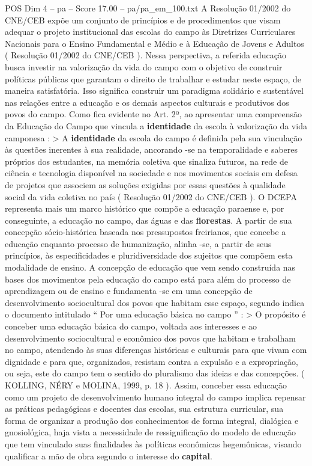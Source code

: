 \begin{textsample}{POS Dim 4 – pa – Score 17.00 – pa/pa\_em\_100.txt}
A Resolução 01/2002 do CNE/CEB expõe um conjunto de princípios e de procedimentos que visam adequar o projeto institucional das escolas do campo às Diretrizes Curriculares Nacionais para o Ensino Fundamental e Médio e à Educação de Jovens e Adultos ( Resolução 01/2002 do CNE/CEB ).
Nessa perspectiva, a referida educação busca investir na valorização da vida do campo com o objetivo de construir políticas públicas que garantam o direito de trabalhar e estudar neste espaço, de maneira satisfatória.
Isso significa construir um paradigma solidário e sustentável nas relações entre a educação e os demais aspectos culturais e produtivos dos povos do campo.
Como fica evidente no Art. 2º, ao apresentar uma compreensão da Educação do Campo que vincula a \textbf{identidade} da escola à valorização da vida camponesa : > A \textbf{identidade} da escola do campo é definida pela sua vinculação às questões inerentes à sua realidade, ancorando -se na temporalidade e saberes próprios dos estudantes, na memória coletiva que sinaliza futuros, na rede de ciência e tecnologia disponível na sociedade e nos movimentos sociais em defesa de projetos que associem as soluções exigidas por essas questões à qualidade social da vida coletiva no país ( Resolução 01/2002 do CNE/CEB ).
O DCEPA representa mais um marco histórico que compõe a educação paraense e, por conseguinte, a educação no campo, das águas e das \textbf{florestas}.
A partir de sua concepção sócio-histórica baseada nos pressupostos freirianos, que concebe a educação enquanto processo de humanização, alinha -se, a partir de seus princípios, às especificidades e pluridiversidade dos sujeitos que compõem esta modalidade de ensino.
A concepção de educação que vem sendo construída nas bases dos movimentos pela educação do campo está para além do processo de aprendizagem ou de ensino e fundamenta -se em uma concepção de desenvolvimento sociocultural dos povos que habitam esse espaço, segundo indica o documento intitulado “ Por uma educação básica no campo ” : > O propósito é conceber uma educação básica do campo, voltada aos interesses e ao desenvolvimento sociocultural e econômico dos povos que habitam e trabalham no campo, atendendo às suas diferenças históricas e culturais para que vivam com dignidade e para que, organizados, resistam contra a expulsão e a expropriação, ou seja, este do campo tem o sentido do pluralismo das ideias e das concepções. ( KOLLING, NÉRY e MOLINA, 1999, p. 18 ).
Assim, conceber essa educação como um projeto de desenvolvimento humano integral do campo implica repensar as práticas pedagógicas e docentes das escolas, sua estrutura curricular, sua forma de organizar a produção dos conhecimentos de forma integral, dialógica e gnosiológica, haja vista a necessidade de ressignificação do modelo de educação que tem vinculado suas finalidades às políticas econômicas hegemônicas, visando qualificar a mão de obra segundo o interesse do \textbf{capital}.

\end{textsample}
